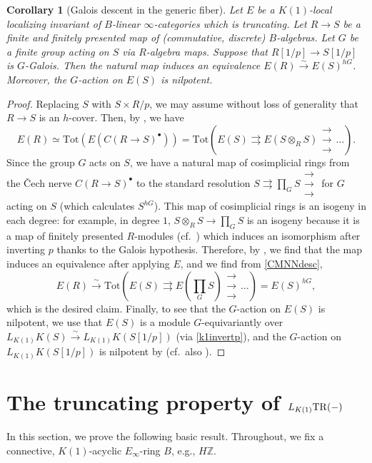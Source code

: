 \documentclass{amsart}
\newcommand{\triplearrows}{\begin{smallmatrix} \to \\ \to \\ 
\to \end{smallmatrix} }
\newtheorem{corollary}[theorem]{Corollary}
\theoremstyle{definition}
\begin{document}
\begin{corollary}[Galois descent in the generic fiber] 
Let $E$ be a $K(1)$-local localizing invariant of $B$-linear
$\infty$-categories which is truncating. 
Let $R \to S$ be a finite and finitely presented map of (commutative, discrete) $B$-algebras. Let $G$ be a finite group acting on $S$ via
$R$-algebra maps. Suppose that $R[1/p] \to S[1/p]$ is $G$-Galois. 
Then the natural map induces an equivalence
$E(R)  \xrightarrow{\sim} E(S)^{hG}$. 
Moreover, the $G$-action on $E(S)$ is nilpotent. \label{galoisdescgeneric}
\end{corollary} 
\begin{proof} 
Replacing $S$ with $S \times R/p$, we may assume without loss of generality that
$R \to S $ is an $h$-cover. 
Then, by , we have
\begin{equation} \label{CMNNdesc} E(R) \simeq \mathrm{Tot}(  E(C(R \to
S)^\bullet)) = \mathrm{Tot}(E(S) \rightrightarrows E(S \otimes_R S ) \triplearrows
\dots ). \end{equation}
Since the group $G$ acts on $S$, we have a natural map of cosimplicial rings
from the \v{C}ech nerve $C(R \to S)^\bullet$ to the standard resolution 
$S \rightrightarrows \prod_G S \triplearrows $
for $G$ acting
on $S$ (which calculates $S^{hG}$). 
This map of cosimplicial rings is an isogeny in each degree: for example, in degree $1$, $S \otimes_R S \to \prod_G
S$ is an isogeny because it is a map of finitely presented $R$-modules 
(cf.~\cite[Tag 0564]{stacks-project})
which
induces an isomorphism after inverting $p$ thanks to the Galois hypothesis. 
Therefore, by ,
we find that 
the map induces an equivalence after applying $E$, and we find 
from \eqref{CMNNdesc},
\[ E(R) \xrightarrow{\sim} \mathrm{Tot}( E(S) \rightrightarrows E( \prod_G S) \triplearrows
\dots ) = E(S)^{hG},\]
which is the desired claim. 
Finally, to see that the 
$G$-action on $E(S)$ 
is nilpotent, we use that $E(S)$ is a module $G$-equivariantly over 
$L_{K(1)} K(S) \xrightarrow{\sim} L_{K(1)} K(S[1/p])$ (via 
\eqref{k1invertp}), and the $G$-action on $L_{K(1)}
K(S[1/p])$ is nilpotent by \cite[Th.~5.6]{CMNN} (cf.~also
\cite[Lem.~4.20]{CM19}). 
\end{proof} 

\section{The truncating property of $L_{K(1)} \mathrm{TR}(-)$}

In this section, we prove the following basic result. 
Throughout, we fix a connective, $K(1)$-acyclic $E_\infty$-ring $B$, e.g.,
$H\mathbb{Z}$. 
\end{document}
